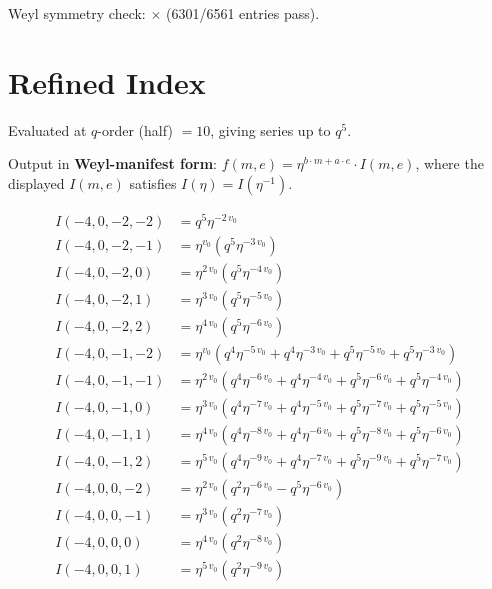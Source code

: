 \documentclass[11pt,a4paper]{article}
\begin{document}
Weyl symmetry check: $\times$ (6301/6561 entries pass).

\section{Refined Index}
Evaluated at $q$-order (half) $= 10$, giving series up to $q^{5}$.

Output in \textbf{Weyl-manifest form}: $f(m,e) = \eta^{b\cdot m + a\cdot e}\cdot I(m,e)$, where the displayed $I(m,e)$ satisfies $I(\eta) = I(\eta^{-1})$.

\begin{align*}
I(-4, 0, -2, -2) &= q^{5} \eta^{-2 \, v_{0}} \\
I(-4, 0, -2, -1) &= \eta^{v_{0}} \left( q^{5} \eta^{-3 \, v_{0}} \right) \\
I(-4, 0, -2, 0) &= \eta^{2 \, v_{0}} \left( q^{5} \eta^{-4 \, v_{0}} \right) \\
I(-4, 0, -2, 1) &= \eta^{3 \, v_{0}} \left( q^{5} \eta^{-5 \, v_{0}} \right) \\
I(-4, 0, -2, 2) &= \eta^{4 \, v_{0}} \left( q^{5} \eta^{-6 \, v_{0}} \right) \\
I(-4, 0, -1, -2) &= \eta^{v_{0}} \left( q^{4} \eta^{-5 \, v_{0}} + q^{4} \eta^{-3 \, v_{0}} + q^{5} \eta^{-5 \, v_{0}} + q^{5} \eta^{-3 \, v_{0}} \right) \\
I(-4, 0, -1, -1) &= \eta^{2 \, v_{0}} \left( q^{4} \eta^{-6 \, v_{0}} + q^{4} \eta^{-4 \, v_{0}} + q^{5} \eta^{-6 \, v_{0}} + q^{5} \eta^{-4 \, v_{0}} \right) \\
I(-4, 0, -1, 0) &= \eta^{3 \, v_{0}} \left( q^{4} \eta^{-7 \, v_{0}} + q^{4} \eta^{-5 \, v_{0}} + q^{5} \eta^{-7 \, v_{0}} + q^{5} \eta^{-5 \, v_{0}} \right) \\
I(-4, 0, -1, 1) &= \eta^{4 \, v_{0}} \left( q^{4} \eta^{-8 \, v_{0}} + q^{4} \eta^{-6 \, v_{0}} + q^{5} \eta^{-8 \, v_{0}} + q^{5} \eta^{-6 \, v_{0}} \right) \\
I(-4, 0, -1, 2) &= \eta^{5 \, v_{0}} \left( q^{4} \eta^{-9 \, v_{0}} + q^{4} \eta^{-7 \, v_{0}} + q^{5} \eta^{-9 \, v_{0}} + q^{5} \eta^{-7 \, v_{0}} \right) \\
I(-4, 0, 0, -2) &= \eta^{2 \, v_{0}} \left( q^{2} \eta^{-6 \, v_{0}} - q^{5} \eta^{-6 \, v_{0}} \right) \\
I(-4, 0, 0, -1) &= \eta^{3 \, v_{0}} \left( q^{2} \eta^{-7 \, v_{0}} \right) \\
I(-4, 0, 0, 0) &= \eta^{4 \, v_{0}} \left( q^{2} \eta^{-8 \, v_{0}} \right) \\
I(-4, 0, 0, 1) &= \eta^{5 \, v_{0}} \left( q^{2} \eta^{-9 \, v_{0}} \right) \\

\end{align*}
\end{document}
